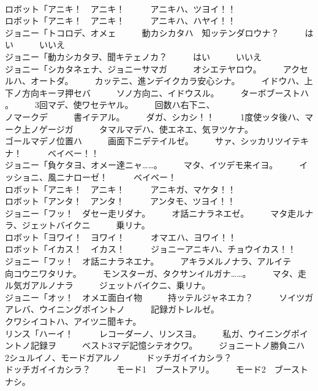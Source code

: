 \documentclass[8pt]{extreport}
\begin{document}
\begin{CJK}{UTF8}{min}
\\	ロボット「アニキ！　アニキ！　　　アニキハ、ツヨイ！！	
\\	ロボット「アニキ！　アニキ！　　　アニキハ、ハヤイ！！	
\\	ジョニー「トコロデ、オメェ　　　動カシカタハ　知ッテンダロウナ？　　　はい　　　いいえ	
\\	ジョニー「動カシカタヲ、聞キテェノカ？　　　はい　　　いいえ	
\\	ジョニー「シカタネェナ、ジョニーサマガ　　　オシエテヤロウ。　　　アクセルハ、オートダ。　　　カッテニ、進ンデイクカラ安心シナ。　　　イドウハ、上下ノ方向キーヲ押セバ　　　ソノ方向ニ、イドウスル。　　　ターボブーストハ
\\	。　　　3回マデ、使ワセテヤル。　　　回数ハ右下ニ、
\\	ノマークデ　　　書イテアル。　　　ダガ、シカシ！！　　　1度使ッタ後ハ、マーク上ノゲージガ　　　タマルマデハ、使エネエ、気ヲツケナ。	
\\	ゴールマデノ位置ハ　　　画面下ニデテイルゼ。　　　サァ、シッカリツイテキナ！　　　ベイベー！！	
\\	ジョニー「負ケタヨ、オメー達ニャ……。　　　マタ、イツデモ来イヨ。　　　イッショニ、風ニナローゼ！　　　ベイベー！	
\\	ロボット「アニキ！　アニキ！　　　アニキガ、マケタ！！	
\\	ロボット「アンタ！　アンタ！　　　アンタモ、ツヨイ！！	
\\	ジョニー「フッ！　ダセー走リダナ。　　　オ話ニナラネエゼ。　　　マタ走ルナラ、ジェットバイクニ　　　乗リナ。	
\\	ロボット「ヨワイ！　ヨワイ！　　　オマエハ、ヨワイ！！	
\\	ロボット「イカス！　イカス！　　　ジョニーアニキハ、チョウイカス！！	
\\	ジョニー「フッ！　オ話ニナラネエナ。　　　アキラメルノナラ、アルイテ　　　向コウニワタリナ。　　　モンスターガ、タクサンイルガナ……。　　　マタ、走ル気ガアルノナラ　　　ジェットバイクニ、乗リナ。	
\\	ジョニー「オッ！　オメエ面白イ物　　　持ッテルジャネエカ？　　　ソイツガアレバ、ウイニングポイントノ　　　記録ガトレルゼ。	
\\	クワシイコトハ、アイツニ聞キナ。	
\\	リンス「ハーイ！　　　レコーダーノ、リンスヨ。　　　私ガ、ウイニングポイントノ記録ヲ　　　ベスト3マデ記憶シテオクワ。　　　ジョニートノ勝負ニハ　　　2シュルイノ、モードガアルノ　　　ドッチガイイカシラ？	
\\	ドッチガイイカシラ？　　　モード1　ブーストアリ。　　　モード2　ブーストナシ。　　　　　　　　

\end{CJK}
\end{document}
